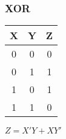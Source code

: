 \documentclass{article}
\begin{document}
\begin{multicols}{2}
\begin{center}
            \subsubsection*{XOR}
            \vspace{1em}
            \begin{tabular}{cc|c}
                X \hspace{1em} & Y \hspace{1em} & \hspace{1em}Z \\
                \hline
                0 \hspace{1em} & 0 \hspace{1em} & \hspace{1em}0 \\
                0 \hspace{1em} & 1 \hspace{1em} & \hspace{1em}1 \\
                1 \hspace{1em} & 0 \hspace{1em} & \hspace{1em}1 \\
                1 \hspace{1em} & 1 \hspace{1em} & \hspace{1em}0 \\
            \end{tabular}

            \vspace{2em}
            $Z=X'Y+XY'$
        \end{center}

        \columnbreak
        \begin{center}

\end{center}
\end{multicols}
\end{document}
